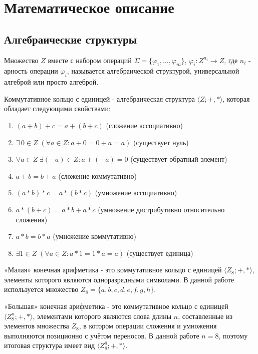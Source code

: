 \section{Математическое описание}


\subsection{Алгебраические структуры}

 Множество $Z$ вместе с набором операций $\Sigma = \{\varphi_1, \ldots, \varphi_m\}$, $\varphi_i : Z^{n_i} \rightarrow Z$, где $n_i$ - арность операции $\varphi_i$, называется алгебраической структурой, универсальной алгеброй или просто алгеброй.


Коммутативное кольцо с единицей - алгебраическая структура $\langle Z; +, * \rangle$, которая обладает следующими свойствами:

\begin{enumerate}
  \item $(a + b) + c = a + (b + c)$ (сложение ассоциативно)
  \item $\exists \, 0 \in Z \; (\forall a \in Z : a + 0 = 0 + a = a)$ (существует нуль)
  \item $\forall a \in Z \; \exists (-a) \in Z : a + (-a) = 0$ (существует обратный элемент)
  \item $a + b = b + a$ (сложение коммутативно)
  \item $(a * b) * c = a * (b * c)$ (умножение ассоциативно)
  \item $a * (b + c) = a * b + a * c$ (умножение дистрибутивно относительно сложения)
  \item $a * b = b * a$ (умножение коммутативно)
  \item $\exists 1 \in Z \; (\forall a \in Z : a * 1 = 1 * a = a)$ (существует единица)
\end{enumerate}

«Малая» конечная арифметика - это коммутативное кольцо с единицей $\langle Z_{8}; +, * \rangle$, элементы которого являются одноразрядными символами. В данной работе используется множество $Z_{8} = \{a, b, c, d, e, f, g, h\}$.

«Большая» конечная арифметика - это коммутативное кольцо с единицей $\langle Z_8^n; +, * \rangle$, элементами которого являются слова длины \(n\), составленные из элементов
множества \(Z_8\), в котором операции сложения и умножения выполняются позиционно с
учётом переносов. В данной работе $n = 8$, поэтому итоговая структура имеет вид $\langle Z_{8}^8; +, * \rangle$.



